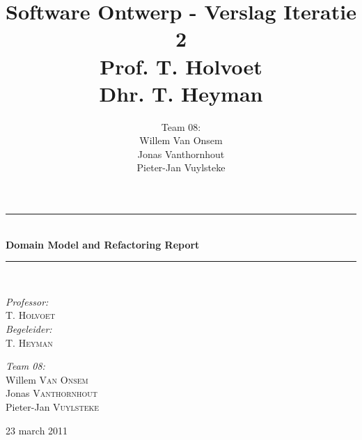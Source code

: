 \documentclass[a4paper,titlepage]{article}
\title{Software Ontwerp - Verslag Iteratie 2\\Prof. T. Holvoet\\Dhr. T. Heyman}
\author{Team 08:\\Willem Van Onsem\\Jonas Vanthornhout\\Pieter-Jan Vuylsteke}
\date{\thedate}
\newcommand{\HRule}{\rule{\linewidth}{0.5mm}}
\newcommand{\thedate}{23 march 2011}
\begin{document}
\begin{titlepage}
\begin{center}
\HRule \\[0.4cm]
{ \huge \bfseries Domain Model and Refactoring Report}\\[0.4cm]
\HRule \\[1.5cm]
\begin{minipage}{0.4\textwidth}
\begin{flushleft} \large
\emph{Professor:}\\
T. \textsc{Holvoet}\\
\emph{Begeleider:}\\
T. \textsc{Heyman}
\end{flushleft}
\end{minipage}
\begin{minipage}{0.4\textwidth}
\begin{flushright} \large
\emph{Team 08:} \\
Willem \textsc{Van Onsem}\\
Jonas \textsc{Vanthornhout}\\
Pieter-Jan \textsc{Vuylsteke}
\end{flushright}
\end{minipage}

\vfill

{\large \thedate }
\end{center}
\end{titlepage}
\tableofcontents
\newpage




\end{document}

